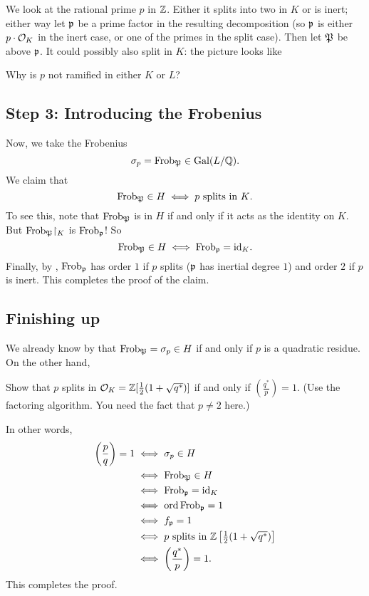 We look at the rational prime $p$ in $\mathbb Z$.
Either it splits into two in $K$ or is inert; either way let $\mathfrak p$ be a prime factor
in the resulting decomposition (so $\mathfrak p$ is either $p \cdot \mathcal O_K$ in the inert case,
or one of the primes in the split case).
Then let ${\mathfrak P}$ be above $\mathfrak p$.
It could possibly also split in $K$: the picture looks like
\begin{center}
\end{center}
\begin{ques}
	Why is $p$ not ramified in either $K$ or $L$?
\end{ques}

\subsection{Step 3: Introducing the Frobenius}
\label{subsec:quadratic_reciprocity_frobenius}
Now, we take the Frobenius
\[ \sigma_p = \mathrm{Frob}_{\mathfrak P} \in \operatorname{Gal}(L/\mathbb Q). \]
We claim that
\[ \mathrm{Frob}_{\mathfrak P} \in H \iff \text{$p$ splits in $K$}. \]
To see this, note that $\mathrm{Frob}_{\mathfrak P}$ is in $H$ if and only if it acts
as the identity on $K$.
But $\Frob_{\kP} \restrict{K}$ is $\mathrm{Frob}_\mathfrak p$!
So \[ \mathrm{Frob}_{\mathfrak P} \in H \iff \mathrm{Frob}_\mathfrak p = \mathrm{id}_K. \]
Finally, by , $\mathrm{Frob}_\mathfrak p$ has order $1$ if $p$ splits
($\mathfrak p$ has inertial degree $1$)
and order $2$ if $p$ is inert.
This completes the proof of the claim.

\subsection{Finishing up}
We already know by  that $\mathrm{Frob}_{\mathfrak P} = \sigma_p \in H$
if and only if $p$ is a quadratic residue.
On the other hand,
\begin{exercise}
	Show that $p$ splits in $\mathcal O_K = \mathbb Z[\frac12(1+\sqrt{q^\ast})]$
	if and only if $\left( \frac{q^\ast}{p} \right) = 1$.
	(Use the factoring algorithm. You need the fact that $p \neq 2$ here.)
\end{exercise}
In other words,
\begin{align*}
	\left( \frac pq \right) = 1
	&\iff \sigma_p \in H \\
	&\iff \mathrm{Frob}_{\mathfrak P} \in H \\
	&\iff \mathrm{Frob}_{\mathfrak p} = \mathrm{id}_K \\
	&\iff \operatorname{ord} \mathrm{Frob}_{\mathfrak p} = 1 \\
	&\iff f_{\mathfrak p} = 1 \\
	&\iff \text{$p$ splits in $\mathbb Z\left[ \tfrac12(1+\sqrt{q^\ast}) \right]$} \\
	&\iff \left( \frac{q^\ast}{p} \right) = 1.
\end{align*}
This completes the proof.


